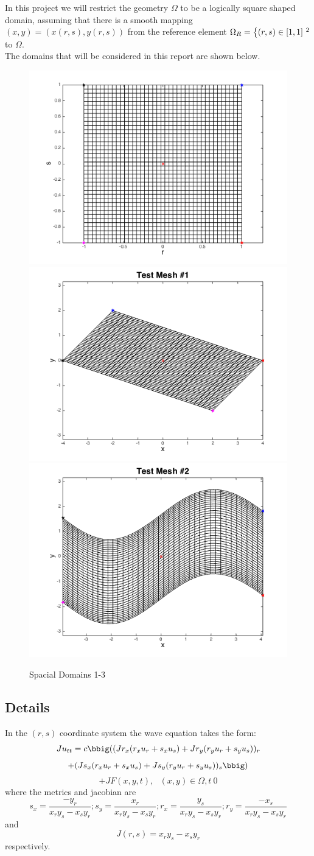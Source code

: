 \documentclass{article}
\begin{document}
In this project we will restrict the geometry \(\Omega\) to be a logically square shaped domain, assuming that there is a smooth mapping \((x,y)=(x(r,s),y(r,s))\) from the reference element \(\Omega_{R}=\big\{(r,s)\in[\-1,1]\ ^{2}\) to \(\Omega\).
\\
The domains that will be considered in this report are shown below.
\begin{figure}[htp]

\centering
\includegraphics[width=.3\textwidth]{squaremap}\hfill
\includegraphics[width=.3\textwidth]{rectmap}\hfill
\includegraphics[width=.3\textwidth]{exhaustmesh}

\caption{Spacial Domains 1-3}
\label{fig:figure3}

\end{figure}


\subsection{Details}
In the \((r,s)\) coordinate system the wave equation takes the form: \cite{hw}
\[
Ju_{tt}=c\bbig((Jr_{x}(r_{x}u_{r}+s_{x}u_{s})+Jr_{y}(r_{y}u_{r}+s_{y}u_{s}))_{r}
\]
\[
+ (Js_{x}(r_{x}u_{r}+s_{x}u_{s})+Js_{y}(r_{y}u_{r}+s_{y}u_{s}))_{s}\bbig)
\]
\[
+JF(x,y,t),\text{   }(x,y)\in \Omega, t\>0
\]
where the metrics and jacobian are
\[
s_{x}=\frac{-y_{r}}{x_{r}y_{s}-x_{s}y_{r}}; s_{y}=\frac{x_{r}}{x_{r}y_{s}-x_{s}y_{r}}; r_{x}=\frac{y_{s}}{x_{r}y_{s}-x_{s}y_{r}}; r_{y}=\frac{-x_{s}}{x_{r}y_{s}-x_{s}y_{r}}
\]
and
\[
J(r,s)=x_{r}y_{s}-x_{s}y_{r}
\]
respectively.
\\
 
\end{document}
